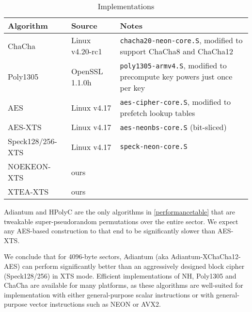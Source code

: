 \documentclass[eprint.tex]{subfiles}
\begin{document}
\begin{table}
    \caption{Implementations}
    \label{implementation}
    \centering
    \begin{tabular}{llp{7cm}}
        \toprule
        Algorithm & Source & Notes \\
    \midrule
    ChaCha & Linux v4.20-rc1 & \texttt{chacha20-neon-core.S}, modified to support
        ChaCha8 and ChaCha12 \\
    Poly1305 & OpenSSL 1.1.0h & \texttt{poly1305-armv4.S}, modified to
        precompute key powers just once per key \\
    \mbox{AES} & Linux v4.17 & \texttt{aes-cipher-core.S}, modified to prefetch
        lookup tables \\
    \mbox{AES-XTS} & Linux v4.17 & \texttt{aes-neonbs-core.S} (bit-sliced) \\
    \mbox{Speck128/256-XTS} & Linux v4.17 & \texttt{speck-neon-core.S} \\
    \mbox{NOEKEON-XTS} & ours & \\
    \mbox{XTEA-XTS} & ours & \\
    \bottomrule
    \end{tabular}
\end{table}

Adiantum and HPolyC are the only algorithms in \autoref{performancetable} that are tweakable
super-pseudorandom permutations over the entire sector.  We expect any AES-based
construction to that end to be significantly slower than \mbox{AES-XTS}.

We conclude that for 4096-byte sectors, Adiantum
(aka \mbox{Adiantum-XChaCha12-AES}) can perform
significantly better than an aggressively designed block cipher (\mbox{Speck128/256}) in XTS mode.
Efficient implementations of NH, Poly1305 and ChaCha are available for many
platforms, as these algorithms are well-suited for implementation with either
general-purpose scalar instructions or with general-purpose vector instructions
such as NEON or AVX2.

\subbib
\end{document}
